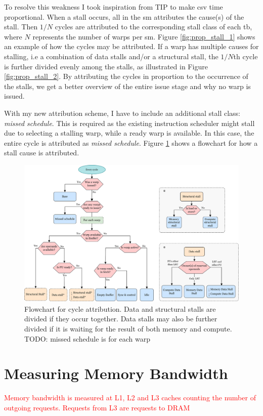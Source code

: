 \noindent
To resolve this weakness I took inspiration from TIP\cite{TIP} to make \acrshort{csv} time proportional. When a stall occurs, all  in the \acrshort{sm} attributes the cause(s) of the stall. Then $1/N$ cycles are attributed to the corresponding stall class of each \acrshort{tb}, where $N$ represents the number of warps per \acrshort{sm}. Figure \ref{fig:prop_stall_1} shows an example of how the cycles may be attributed. If a warp has multiple causes for stalling, i.e a combination of data stalls and/or a structural stall, the $1/N$th cycle is further divided evenly among the stalls, as illustrated in Figure \ref{fig:prop_stall_2}. By attributing the cycles in proportion to the occurrence of the stalls, we get a better overview of the entire issue stage and why no warp is issued.

With my new attribution scheme, I have to include an additional stall class: \textit{missed schedule}. This is required as the existing instruction scheduler might stall due to selecting a stalling warp, while a ready warp is available. In this case, the entire cycle is attributed as \textit{missed schedule}. Figure \ref{fig:cpi_flowchart} shows a flowchart for how a stall cause is attributed.

\begin{figure}
    \centering
    \includegraphics[width=\textwidth]{figures/flowchart_grouped.png}
    \caption[Flowchart for cycle \acrshort{csv}'s cycle attribution.]{Flowchart for cycle attribution. Data and structural stalls are divided if they occur together. Data stalls may also be further divided if it is waiting for the result of both memory and compute. TODO: missed schedule is for each warp}
    \label{fig:cpi_flowchart}
\end{figure}

\section{Measuring Memory Bandwidth}

\textcolor{red}{Memory bandwidth is measured at L1, L2 and L3 caches counting the number of outgoing requests. Requests from L3 are requests to DRAM}